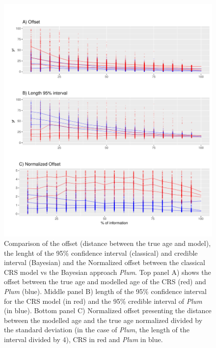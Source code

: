 \documentclass [10pt] {article}
\begin{document}
\begin{figure}
 \centering
  \includegraphics[width=\linewidth]{AccPrec.pdf}
	\caption{Comparison of the offset (distance between the true age and model), the lenght of the 95\% confidence interval (classical) and credible interval (Bayesian) and the Normalized offset between the classical CRS model vs the Bayesian approach \textit{Plum}. Top panel A) shows the offset between the true age and modelled age of the CRS (red) and \textit{Plum} (blue). Middle panel B) length of the 95\% confidence interval for the CRS model (in red) and the 95\% credible interval of \textit{Plum} (in blue). Bottom panel C) Normalized offset presenting the distance between the modelled age and the true age normalized divided by the standard deviation (in the case of \textit{Plum}, the length of the interval divided by 4), CRS in red and \textit{Plum} in blue.    }
  \label{fig:accpre}
\end{figure}
\end{document}
